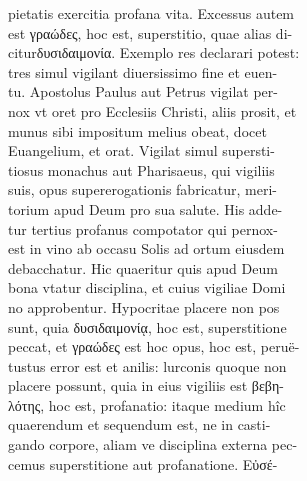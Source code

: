 \documentclass{article}
\begin{document}
\begin{pages}
                pietatis exercitia profana vita. Excessus autem \\
                est γραώδες, hoc est, superstitio, quae alias di- \\
                citurδυσιδαιμονία. Exemplo res declarari potest: \\
                tres simul vigilant diuersissimo fine et euen- \\
                tu. Apostolus Paulus aut Petrus vigilat per- \\
                nox vt oret pro Ecclesiis Christi, aliis prosit, et \\
                munus sibi impositum melius obeat, docet \\
                Euangelium, et orat. Vigilat simul supersti- \\
                tiosus monachus aut Pharisaeus, qui vigiliis \\
                suis, opus supererogationis fabricatur, meri- \\
                torium apud Deum pro sua salute. His adde- \\
                tur tertius profanus compotator qui pernox- \\
                est in vino ab occasu Solis ad ortum eiusdem \\
                debacchatur. Hic quaeritur quis apud Deum \\
                bona vtatur disciplina, et cuius vigiliae Domi \\
                no approbentur. Hypocritae placere non pos \\
                sunt, quia δυσιδαιμονίᾳ, hoc est, superstitione \\
                peccat, et γραώδες est hoc opus, hoc est, peruë- \\
                tustus error est et anilis: lurconis quoque non \\
                placere possunt, quia in eius vigiliis est βεβη- \\
                λότης, hoc est, profanatio: itaque medium hîc \\
                quaerendum et sequendum est, ne in casti- \\
                gando corpore, aliam ve disciplina externa pec- \\
                cemus superstitione aut profanatione. Εὐσέ- \\

\end{pages}
\end{document}
